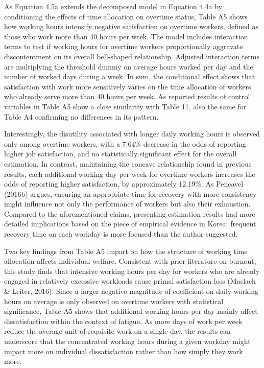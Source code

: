\documentclass[
  12pt,
]{article}
\begin{document}
As Equation 4.5a extends the decomposed model in Equation 4.4a by
conditioning the effects of time allocation on overtime status, Table A5
shows how working hours intensify negative satisfaction on overtime
workers, defined as those who work more than 40 hours per week. The
model includes interaction terms to test if working hours for overtime
workers proportionally aggravate discontentment on its overall
bell-shaped relationship. Adjusted interaction terms are multiplying the
threshold dummy on average hours worked per day and the number of worked
days during a week. In sum, the conditional effect shows that
satisfaction with work more sensitively varies on the time allocation of
workers who already serve more than 40 hours per week. As reported
results of control variables in Table A5 show a close similarity with
Table 11, also the same for Table A4 confirming no differences in its
pattern.

Interestingly, the disutility associated with longer daily working hours
is observed only among overtime workers, with a 7.64\% decrease in the
odds of reporting higher job satisfaction, and no statistically
significant effect for the overall estimation. In contrast, maintaining
the concave relationship found in previous results, each additional
working day per week for overtime workers increases the odds of
reporting higher satisfaction, by approximately 12.19\%. As Pencavel
(2016b) argues, ensuring an appropriate time for recovery with more
consistency might influence not only the performance of workers but also
their exhaustion. Compared to the aforementioned claims, presenting
estimation results had more detailed implications based on the piece of
empirical evidence in Korea: frequent recovery time on each workday is
more focused than the author suggested.

Two key findings from Table A5 impart on how the structure of working
time allocation affects individual welfare. Consistent with prior
literature on burnout, this study finds that intensive working hours per
day for workers who are already engaged in relatively excessive
workloads cause primal satisfaction loss (Maslach \& Leiter, 2016).
Since a larger negative magnitude of coefficient on daily working hours
on average is only observed on overtime workers with statistical
significance, Table A5 shows that additional working hours per day
mainly affect dissatisfaction within the context of fatigue. As more
days of work per week reduce the average unit of requisite work on a
single day, the results can underscore that the concentrated working
hours during a given workday might impact more on individual
dissatisfaction rather than how simply they work more.
\end{document}
